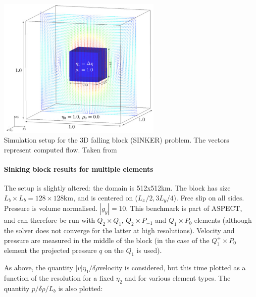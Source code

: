 \begin{center}
\includegraphics[width=8cm]{images/benchmark_sinker/fumt11}\\
{\captionfont Simulation setup for the 3D falling block (SINKER) problem. The vectors represent computed flow.
Taken from \cite{fumt11}}
\end{center}


\paragraph{Sinking block results for multiple elements}

The setup is slightly altered: the domain is 512x512km. The block has size $L_b\times L_b=128\times 128$km, and is centered
on ($L_x/2,3L_y/4$). Free slip on all sides. Pressure is volume normalised. $|g_y|=10$.
This benchmark is part of ASPECT, and can therefore be run with $Q_2\times Q_1$, $Q_2\times P_{-1}$ and $Q_1\times P_0$ elements (although the solver does not converge for the latter at high resolutions).
Velocity and pressure are measured in the middle of the block (in the case of the $Q_1^+\times P_0$ element the 
projected pressure $q$ on the $Q_1$ is used).

As above, the quantity $|v|\eta_1/\delta\rho$velocity is considered, but this time plotted as a function 
of the resolution for a fixed $\eta_2$ and for various element types. The quantity $p/\delta\rho/L_b$
is also plotted:

